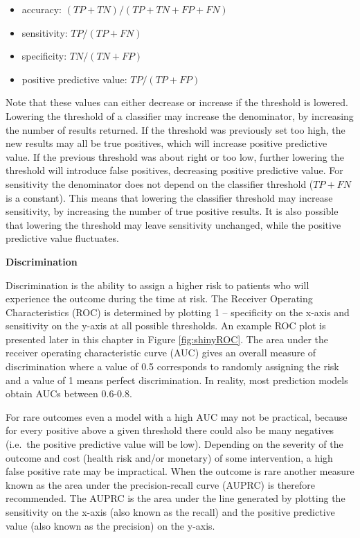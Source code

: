 \documentclass[11pt]{book}
\providecommand{\tightlist}{%
  \setlength{\itemsep}{0pt}\setlength{\parskip}{0pt}}
\theoremstyle{definition}
\theoremstyle{definition}
\theoremstyle{definition}
\theoremstyle{remark}
\begin{document}
\begin{itemize}
\tightlist
\item
  accuracy: \((TP+TN)/(TP+TN+FP+FN)\)
\item
  sensitivity: \(TP/(TP+FN)\)
\item
  specificity: \(TN/(TN+FP)\)
\item
  positive predictive value: \(TP/(TP+FP)\)
\end{itemize}

Note that these values can either decrease or increase if the threshold is lowered. Lowering the threshold of a classifier may increase the denominator, by increasing the number of results returned. If the threshold was previously set too high, the new results may all be true positives, which will increase positive predictive value. If the previous threshold was about right or too low, further lowering the threshold will introduce false positives, decreasing positive predictive value. For sensitivity the denominator does not depend on the classifier threshold (\(TP+FN\) is a constant). This means that lowering the classifier threshold may increase sensitivity, by increasing the number of true positive results. It is also possible that lowering the threshold may leave sensitivity unchanged, while the positive predictive value fluctuates.

\textbf{Discrimination}

Discrimination is the ability to assign a higher risk to patients who will experience the outcome during the time at risk. The Receiver Operating Characteristics (ROC) is determined by plotting 1 -- specificity on the x-axis and sensitivity on the y-axis at all possible thresholds. An example ROC plot is presented later in this chapter in Figure \ref{fig:shinyROC}. The area under the receiver operating characteristic curve (AUC) gives an overall measure of discrimination where a value of 0.5 corresponds to randomly assigning the risk and a value of 1 means perfect discrimination. In reality, most prediction models obtain AUCs between 0.6-0.8.   

For rare outcomes even a model with a high AUC may not be practical, because for every positive above a given threshold there could also be many negatives (i.e.~the positive predictive value will be low). Depending on the severity of the outcome and cost (health risk and/or monetary) of some intervention, a high false positive rate may be impractical. When the outcome is rare another measure known as the area under the precision-recall curve (AUPRC) is therefore recommended. The AUPRC is the area under the line generated by plotting the sensitivity on the x-axis (also known as the recall) and the positive predictive value (also known as the precision) on the y-axis. 
\end{document}
